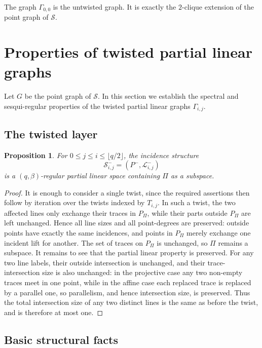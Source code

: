 \documentclass[reqno,a4paper,11pt]{article}
\newtheorem{pro}[thm]{Proposition}
\theoremstyle{definition}
\theoremstyle{remark}
\begin{document}
The graph $\Gamma_{0,0}$ is the untwisted graph.
It is exactly the $2$-clique extension of the point graph of $\mathcal S$.

\section{Properties of twisted partial linear graphs}\label{sec:tpl-properties}

Let $G$ be the point graph of $\mathcal S$.
In this section we establish the spectral and sesqui-regular properties of the twisted partial linear graphs $\Gamma_{i,j}$.

\subsection{The twisted layer}

\begin{pro}\label{prop:twisted-pls}
For $0\le j\le i\le \lfloor q/2\rfloor$, the incidence structure
\[
\mathcal S^-_{i,j}=(P^-,\mathcal L^-_{i,j})
\]
is a $(q,\beta)$-regular partial linear space containing $\Pi$ as a subspace.
\end{pro}
\begin{proof}
	It is enough to consider a single twist, since the required assertions then follow by iteration over the twists indexed by $T_{i,j}$.
	In such a twist, the two affected lines only exchange their traces in $P_\Pi$, while their parts outside $P_\Pi$ are left unchanged.
	Hence all line sizes and all point-degrees are preserved: outside points have exactly the same incidences, and points in $P_\Pi$ merely exchange one incident lift for another.
	The set of traces on $P_\Pi$ is unchanged, so $\Pi$ remains a subspace.
	It remains to see that the partial linear property is preserved.
	For any two line labels, their outside intersection is unchanged, and their trace-intersection size is also unchanged: in the projective case any two non-empty traces meet in one point, while in the affine case each replaced trace is replaced by a parallel one, so parallelism, and hence intersection size, is preserved.
	Thus the total intersection size of any two distinct lines is the same as before the twist, and is therefore at most one.
\end{proof}


\subsection{Basic structural facts}
\end{document}
